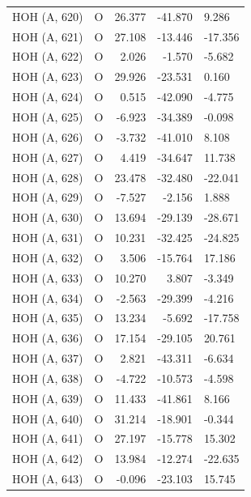 \begin{longtable}{@{}lcrr@{}}
  \cmidrule(r){1-5}
  HOH (A, 620) & O & 26.377 & -41.870 & 9.286 \\
  \cmidrule(r){1-5}
  HOH (A, 621) & O & 27.108 & -13.446 & -17.356 \\
  \cmidrule(r){1-5}
  HOH (A, 622) & O & 2.026 & -1.570 & -5.682 \\
  \cmidrule(r){1-5}
  HOH (A, 623) & O & 29.926 & -23.531 & 0.160 \\
  \cmidrule(r){1-5}
  HOH (A, 624) & O & 0.515 & -42.090 & -4.775 \\
  \cmidrule(r){1-5}
  HOH (A, 625) & O & -6.923 & -34.389 & -0.098 \\
  \cmidrule(r){1-5}
  HOH (A, 626) & O & -3.732 & -41.010 & 8.108 \\
  \cmidrule(r){1-5}
  HOH (A, 627) & O & 4.419 & -34.647 & 11.738 \\
  \cmidrule(r){1-5}
  HOH (A, 628) & O & 23.478 & -32.480 & -22.041 \\
  \cmidrule(r){1-5}
  HOH (A, 629) & O & -7.527 & -2.156 & 1.888 \\
  \cmidrule(r){1-5}
  HOH (A, 630) & O & 13.694 & -29.139 & -28.671 \\
  \cmidrule(r){1-5}
  HOH (A, 631) & O & 10.231 & -32.425 & -24.825 \\
  \cmidrule(r){1-5}
  HOH (A, 632) & O & 3.506 & -15.764 & 17.186 \\
  \cmidrule(r){1-5}
  HOH (A, 633) & O & 10.270 & 3.807 & -3.349 \\
  \cmidrule(r){1-5}
  HOH (A, 634) & O & -2.563 & -29.399 & -4.216 \\
  \cmidrule(r){1-5}
  HOH (A, 635) & O & 13.234 & -5.692 & -17.758 \\
  \cmidrule(r){1-5}
  HOH (A, 636) & O & 17.154 & -29.105 & 20.761 \\
  \cmidrule(r){1-5}
  HOH (A, 637) & O & 2.821 & -43.311 & -6.634 \\
  \cmidrule(r){1-5}
  HOH (A, 638) & O & -4.722 & -10.573 & -4.598 \\
  \cmidrule(r){1-5}
  HOH (A, 639) & O & 11.433 & -41.861 & 8.166 \\
  \cmidrule(r){1-5}
  HOH (A, 640) & O & 31.214 & -18.901 & -0.344 \\
  \cmidrule(r){1-5}
  HOH (A, 641) & O & 27.197 & -15.778 & 15.302 \\
  \cmidrule(r){1-5}
  HOH (A, 642) & O & 13.984 & -12.274 & -22.635 \\
  \cmidrule(r){1-5}
  HOH (A, 643) & O & -0.096 & -23.103 & 15.745 \\

\end{longtable}
